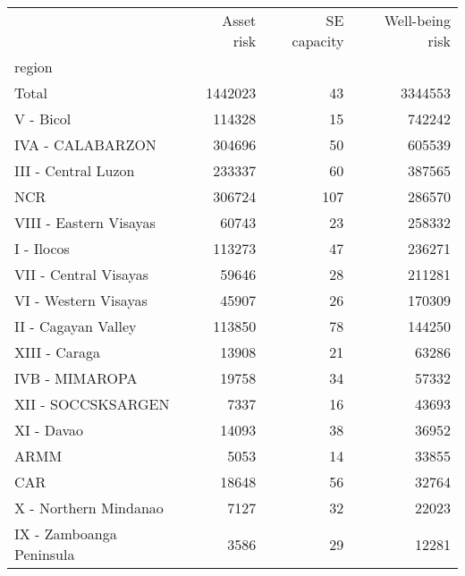 \begin{tabular}{lrrr}
\toprule
{} &  Asset risk &  SE capacity &  Well-being risk \\
region                   &             &              &                  \\
\midrule
Total                    &     1442023 &           43 &          3344553 \\
V - Bicol                &      114328 &           15 &           742242 \\
IVA - CALABARZON         &      304696 &           50 &           605539 \\
III - Central Luzon      &      233337 &           60 &           387565 \\
NCR                      &      306724 &          107 &           286570 \\
VIII - Eastern Visayas   &       60743 &           23 &           258332 \\
I - Ilocos               &      113273 &           47 &           236271 \\
VII - Central Visayas    &       59646 &           28 &           211281 \\
VI - Western Visayas     &       45907 &           26 &           170309 \\
II - Cagayan Valley      &      113850 &           78 &           144250 \\
XIII - Caraga            &       13908 &           21 &            63286 \\
IVB - MIMAROPA           &       19758 &           34 &            57332 \\
XII - SOCCSKSARGEN       &        7337 &           16 &            43693 \\
XI - Davao               &       14093 &           38 &            36952 \\
ARMM                     &        5053 &           14 &            33855 \\
CAR                      &       18648 &           56 &            32764 \\
X - Northern Mindanao    &        7127 &           32 &            22023 \\
IX - Zamboanga Peninsula &        3586 &           29 &            12281 \\
\bottomrule
\end{tabular}
